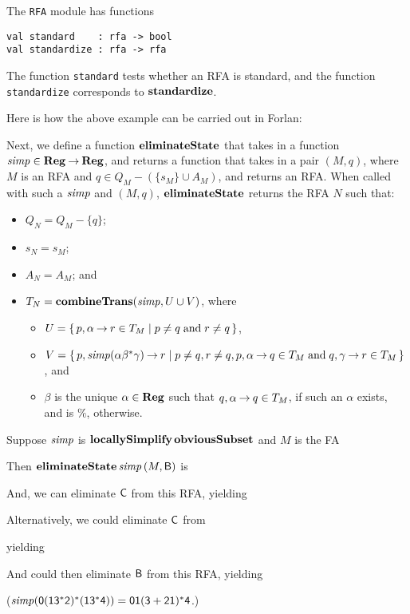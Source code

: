 The \texttt{RFA} module has functions
\begin{verbatim}
val standard    : rfa -> bool
val standardize : rfa -> rfa
\end{verbatim}
The function \texttt{standard} tests whether an RFA is standard,
and the function \texttt{standardize} corresponds to
$\mathbf{standardize}$.

Here is how the above example can be carried out in Forlan:


Next, we define a function $\mathbf{eliminateState}$ that takes in a function
${\it simp}\in\mathbf{Reg}\mathbin{\to}\mathbf{Reg}$, and returns a function that takes in a pair
$(M, q)$, where $M$ is an RFA and $q\in Q_M-(\{s_M\}\cup A_M)$, and
returns an RFA.  When called with such a ${\it simp}$ and $(M,q)$,
$\mathbf{eliminateState}$ returns the RFA $N$ such that:
\begin{itemize}
\item $Q_N = Q_M - \{q\}$;

\item $s_N = s_M$;

\item $A_N = A_M$; and

\item $T_N = \mathbf{combineTrans}({\it simp}, U\cup V)$, where
  \begin{itemize}
  \item $U = \{ \, p,\alpha\mathbin{\to} r\in T_M \mid p\neq q\;\allowbreak\mbox{and}\allowbreak\;r\neq
      q \, \}$,

  \item $V = \{ \, p,{\it simp}(\alpha\beta^*\gamma)\mathbin{\to} r \mid p\neq q, r\neq
      q, p,\alpha\mathbin{\to} q\in T_M \;\allowbreak\mbox{and}\allowbreak\; q,\gamma\mathbin{\to} r\in T_M \, \}$, and

  \item $\beta$ is the unique $\alpha\in\mathbf{Reg}$ such that
    $q,\alpha\mathbin{\to} q\in T_M$, if such an $\alpha$ exists, and is $\%$,
    otherwise.
  \end{itemize}
\end{itemize}

Suppose ${\it simp}$ is $\mathbf{locallySimplify}\,\mathbf{obviousSubset}$ and $M$ is the FA
\begin{center}

\end{center}
Then $\mathbf{eliminateState}\,{\it simp}\,(M, \mathsf{B})$ is
\begin{center}

\end{center}
And, we can eliminate $\mathsf{C}$ from this RFA, yielding
\begin{center}

\end{center}
Alternatively, we could eliminate $\mathsf{C}$ from
\begin{center}

\end{center}
yielding
\begin{center}

\end{center}
And could then eliminate $\mathsf{B}$ from this RFA, yielding
\begin{center}

\end{center}
(${\it simp}(\mathsf{0(13^*2)^*(13^*4)}) = \mathsf{01(3+21)^*4}$.)

